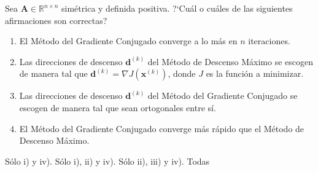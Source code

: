 \begin{pregunta}
\begin{cuerpo}
Sea $\boldsymbol{A}\in\mathbb{R}^{n\times n}$ sim\'etrica y definida positiva.
?`Cu\'al o cu\'ales de las siguientes afirmaciones son correctas?
\begin{enumerate}
\item[i)] El M\'etodo del Gradiente Conjugado converge a lo m\'as en $n$ iteraciones.
\item[ii)] Las direcciones de descenso $\boldsymbol{d}^{(k)}$ del M\'etodo de Descenso M\'aximo se escogen de manera tal que  $\boldsymbol{d}^{(k)}=\nabla J(\boldsymbol{x}^{(k)})$, donde $J$ es la funci\'on a minimizar.
\item[iii)] Las direcciones de descenso $\boldsymbol{d}^{(k)}$ del M\'etodo del Gradiente Conjugado se escogen de manera tal que  sean ortogonales entre s\'i.
\item[iv)] El M\'etodo del Gradiente Conjugado converge m\'as r\'apido que el M\'etodo de Descenso M\'aximo.
\end{enumerate}
\end{cuerpo}
\begin{multicols}{2}
\begin{alternativas}
{S\'olo i) y iv).} %
{S\'olo i), ii) y iv).}
{S\'olo ii), iii) y iv).}
{Todas}
\end{alternativas}
\end{multicols}
\justificacion{0cm}
\end{pregunta}
